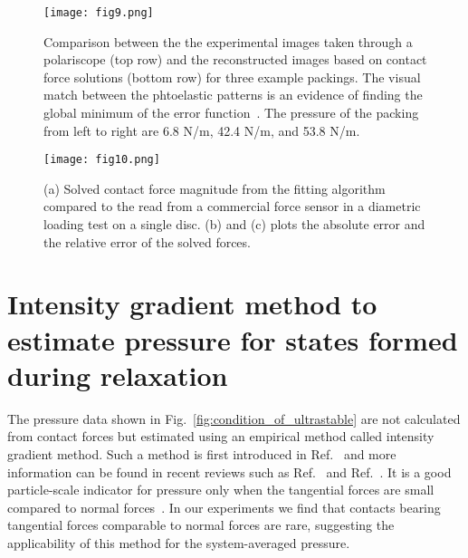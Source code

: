 \documentclass[twocolumn,showkeys,superscriptaddress,preprintnumbers,amsmath,amssymb,showpacs,prx,longbibliography]{revtex4-2}
\begin{document}
\begin{figure}[!t]
    \centering
    \texttt{[image: fig9.png]}
    \caption{Comparison between the the experimental images taken through a polariscope (top row) and the reconstructed images based on contact force solutions (bottom row) for three example packings. The visual match between the phtoelastic patterns is an evidence of finding the global minimum of the error function~\cite{zadeh2019_gm,Daniels2017_rsi,zhao2020_phd}. The pressure of the packing from left to right are 6.8 N/m, 42.4 N/m, and 53.8 N/m.}
    \label{fig:sm:inverse:compare_patterns}
\end{figure}

\begin{figure}[!t]
    \centering
    \texttt{[image: fig10.png]}
    \caption{(a) Solved contact force magnitude from the fitting algorithm compared to the read from a commercial force sensor in a diametric loading test on a single disc. (b) and (c) plots the absolute error and the relative error of the solved forces.}
    \label{fig:sm:inverse:calibration}
\end{figure}





\section{Intensity gradient method to estimate pressure for states formed during relaxation}\label{app_g2}

The pressure data shown in Fig.~\ref{fig:condition_of_ultrastable} are not calculated from contact forces but estimated using an empirical method called intensity gradient method. Such a method is first introduced in Ref.~\cite{Howell1999_prl} and more information can be found in recent reviews such as Ref.~\cite{Daniels2017_rsi} and Ref.~\cite{zadeh2019_gm}. It is a good particle-scale indicator for pressure only when the tangential forces are small compared to normal forces~\cite{zhao2019_njp}. In our experiments we find that contacts bearing tangential forces comparable to normal forces are rare, suggesting the applicability of this method for the system-averaged pressure. 
\end{document}
